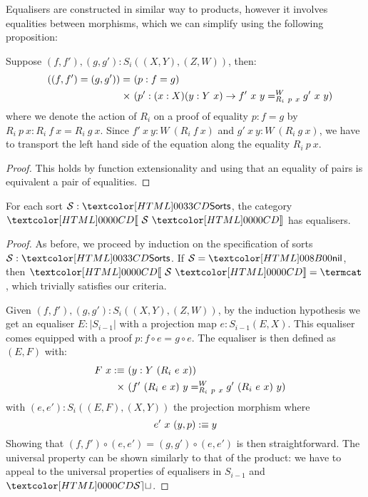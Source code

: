 Equalisers are constructed in similar way to products, however it
involves equalities between morphisms, which we can simplify using the
following proposition:

\begin{proposition}
  Suppose $(f,f'), (g,g') : S_i((X,Y),(Z,W))$, then:
  \begin{align*}
    &&((f,f') = (g,g')) =&\ (p : f = g) \\
    &&\times&\ (p' : (x : X) (y : Y\ x) \to \pathover{W}{R_i\ p\ x}{f'\ x\ y}{g'\ x\ y})
  \end{align*}
  where we denote the action of $R_i$ on a proof of equality
  $p : f = g$ by $R_i\ p\ x : R_i\ f\ x = R_i\ g\ x$. Since
  $f'\ x\ y : W\ (R_i\ f\ x)$ and $g'\ x\ y : W\ (R_i\ g\ x)$, we have
  to transport the left hand side of the equation along the equality
  $R_i\ p\ x$.
\end{proposition}

\begin{proof}
  This holds by function extensionality and using that an equality of
  pairs is equivalent a pair of equalities.
\end{proof}
\begin{lemma}
\label{sorts-equalisers}
  For each sort $\Ss : \sortsty$, the category $\SortCat{\Ss}$ has
  equalisers.
\end{lemma}

\begin{proof}
  As before, we proceed by induction on the specification of sorts
  $\Ss : \sortsty$.  If $\Ss = \sortsnil$, then $\SortCat{\Ss} = \termcat$,
  which trivially satisfies our criteria.



  Given $(f,f'), (g,g') : S_i((X,Y),(Z,W))$, by the induction
  hypothesis we get an equaliser $E : |S_{i-1}|$ with a projection map
  $e : S_{i-1}(E,X)$. This equaliser comes equipped with a proof
  $p : f \circ e = g \circ e$. The equaliser is then defined as
  $(E,F)$ with:
  \begin{align*}
    &&F\ x \ddefeq&\ (y : Y\ (R_i\ e\ x)) \\
    && \times&\ (\pathover{W}{R_i\ p\ x}{f'\ (R_i\ e\ x)\ y}{g'\ (R_i\ e\ x)\ y})
  \end{align*}
  with $(e,e') : S_i((E,F),(X,Y))$ the projection morphism where
  $$
  e'\ x\ (y , p) \ddefeq y
  $$
  Showing that $(f,f') \circ (e,e') = (g,g') \circ (e,e')$ is then
  straightforward. The universal property can be shown similarly to
  that of the product: we have to appeal to the universal properties
  of equalisers in $S_{i-1}$ and $\SET$.
\end{proof}

